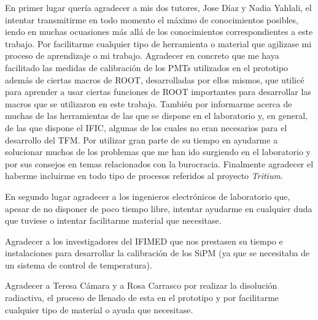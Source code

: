 En primer lugar quería agradecer a mis dos tutores, Jose Díaz y Nadia Yahlali, el intentar transmitirme en todo momento el máximo de conocimientos posibles, iendo en muchas ocuasiones más allá de los conocimientos correspondientes a este trabajo. Por facilitarme cualquier tipo de herramienta o material que agilizase mi proceso de aprendizaje o mi trabajo. Agradecer en concreto que me haya facilitado las medidas de calibración de los PMTs utilizados en el prototipo además de ciertas macros de ROOT, desarrolladas por ellos mismos, que utilicé para aprender a usar ciertas funciones de ROOT importantes para desarrollar las macros que se utilizaron en este trabajo. También por informarme acerca de muchas de las herramientas de las que se dispone en el laboratorio y, en general, de las que dispone el IFIC, algunas de los cuales no eran necesarios para el desarrollo del TFM. Por utilizar gran parte de su tiempo en ayudarme a solucionar muchos de los problemas que me han ido surgiendo en el laboratorio y por sus consejos en temas relacionados con la burocracia. Finalmente agradecer el haberme incluirme en todo tipo de procesos referidos al proyecto \textit{Tritium}. 

En segundo lugar agradecer a los ingenieros electrónicos de laboratorio que, apesar de no disponer de poco tiempo libre, intentar ayudarme en cualquier duda que tuviese o intentar facilitarme material que necesitase.

Agradecer a los investigadores del IFIMED que nos prestasen su tiempo e instalaciones para desarrollar la calibración de los SiPM (ya que se necesitaba de un sistema de control de temperatura).

Agradecer a Teresa Cámara y a Rosa Carrasco por realizar la disolución radiactiva, el proceso de llenado de esta en el prototipo y por facilitarme cualquier tipo de material o ayuda que necesitase.
